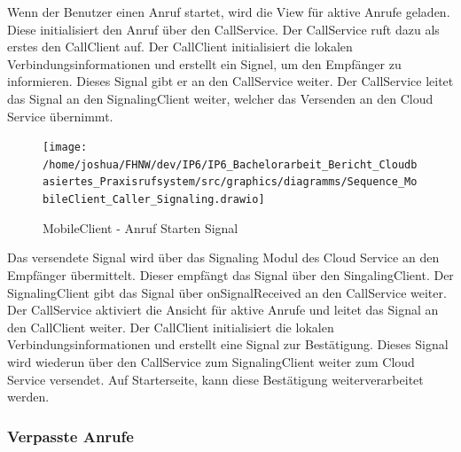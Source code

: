 Wenn der Benutzer einen Anruf startet, wird die View für aktive Anrufe geladen.
Diese initialisiert den Anruf über den CallService.
Der CallService ruft dazu als erstes den CallClient auf.
Der CallClient initialisiert die lokalen Verbindungsinformationen und erstellt ein Signel, um den Empfänger zu informieren.
Dieses Signal gibt er an den CallService weiter.
Der CallService leitet das Signal an den SignalingClient weiter, welcher das Versenden an den Cloud Service übernimmt.

\begin{figure}[h]
    \centering
    \begin{minipage}[b]{0.8\textwidth}
        \texttt{[image: /home/joshua/FHNW/dev/IP6/IP6\_Bachelorarbeit\_Bericht\_Cloudbasiertes\_Praxisrufsystem/src/graphics/diagramms/Sequence\_MobileClient\_Caller\_Signaling.drawio]}
        \caption{MobileClient - Anruf Starten Signal}
    \end{minipage}
\end{figure}

Das versendete Signal wird über das Signaling Modul des Cloud Service an den Empfänger übermittelt.
Dieser empfängt das Signal über den SingalingClient.
Der SignalingClient gibt das Signal über onSignalReceived an den CallService weiter.
Der CallService aktiviert die Ansicht für aktive Anrufe und leitet das Signal an den CallClient weiter.
Der CallClient initialisiert die lokalen Verbindungsinformationen und erstellt eine Signal zur Bestätigung.
Dieses Signal wird wiederun über den CallService zum SignalingClient weiter zum Cloud Service versendet.
Auf Starterseite, kann diese Bestätigung weiterverarbeitet werden.

\clearpage

\subsubsection{Verpasste Anrufe}

